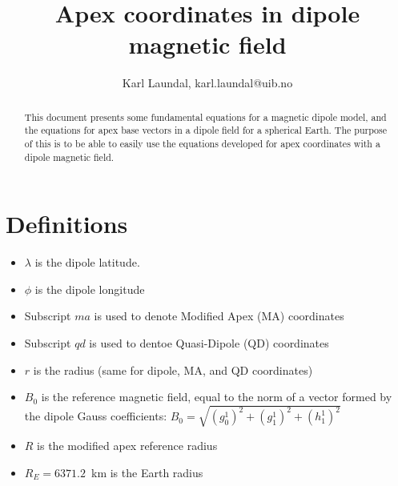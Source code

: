 \documentclass[11pt]{article}
\title{Apex coordinates in dipole magnetic field}
\author{Karl Laundal, karl.laundal@uib.no}
\begin{document}
\maketitle
\modulolinenumbers[2]

\begin{abstract}
This document presents some fundamental equations for a magnetic dipole model, and the equations for apex base vectors in a dipole field for a spherical Earth. The purpose of this is to be able to easily use the equations developed for apex coordinates with a dipole magnetic field. 
\end{abstract}

\section{Definitions}

\begin{itemize}
\item $\lambda$ is the dipole latitude. 
\item $\phi$ is the dipole longitude
\item Subscript $ma$ is used to denote Modified Apex (MA) coordinates
\item Subscript $qd$ is used to dentoe Quasi-Dipole (QD) coordinates
\item $r$ is the radius (same for dipole, MA, and QD coordinates)
\item $B_0$ is the reference magnetic field, equal to the norm of a vector formed by the dipole Gauss coefficients: $B_0 = \sqrt{(g_0^1)^2 + (g_1^1)^2 + (h_1^1)^2}$
\item $R$ is the modified apex reference radius
\item $R_E=6371.2$~km is the Earth radius
\end{itemize}
\end{document}
